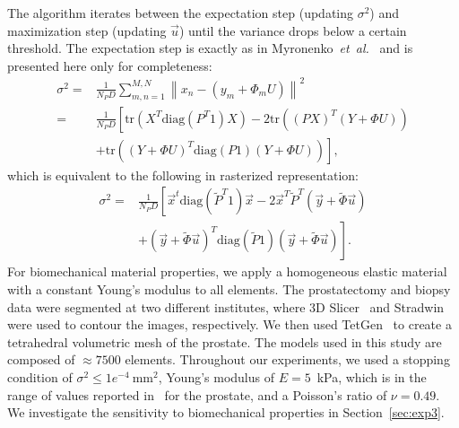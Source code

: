 \documentclass[journal]{IEEEtran}
\newcommand{\trace}{\mathrm{tr}}
\newcommand{\diag}{\mathrm{diag}}
\begin{document}
The algorithm iterates between the expectation step (updating $\sigma^2$) and maximization step (updating $\vec{u}$) until the variance drops below a certain threshold.  The expectation step is exactly as in Myronenko~\textit{et~al.}~\cite{Myronenko10a} and is presented here only for completeness:
\begin{align}
\sigma^2 = & \frac{1}{N_PD}\sum_{m,n=1}^{M,N}\left\|x_n- (y_m+\Phi_mU)\right\|^2 \nonumber\\
= & \frac{1}{N_PD}\left[\trace\!\left(X^T\diag(P^T1)X\right)-2\trace\!\left((PX)^T(Y+{\Phi}U)\right)\right.\nonumber\\
& \left.+\trace\!\left((Y+{\Phi}U)^T\diag(P1)(Y+{\Phi}U)\right)\right], \label{eq:estep1}
\end{align}
which is equivalent to the following in rasterized representation:
\begin{align} 
\sigma^2 = & \frac{1}{N_PD}\left[\vec{x}^t\diag\!\left(\tilde{P}^T1\right)\vec{x} -2\vec{x}^T\tilde{P}^T(\vec{y}+\tilde{\Phi}\vec{u})\right.\nonumber\\
  & \left.+(\vec{y}+\tilde{\Phi}\vec{u})^T\diag\!\left(\tilde{P}1\right)(\vec{y}+\tilde{\Phi}\vec{u})\right]. \label{eq:estep2}
\end{align}
For biomechanical material properties, we apply a homogeneous elastic material with a constant Young's modulus to all elements. The prostatectomy and biopsy data were segmented at two different institutes, where 3D Slicer~\cite{Fedorov12a} and Stradwin~\cite{Treece00a} were used to contour the images, respectively. We then used TetGen~\cite{Si06a} to create a tetrahedral volumetric mesh of the prostate.  The models used in this study are composed of $\approx7500$ elements. Throughout our experiments, we used a stopping condition of $\sigma^2\leq1e^{-4}~\mathrm{mm}^2$, Young's modulus of $E=5$~kPa, which is in the range of values reported in~\cite{Kemper04a} for the prostate, and a Poisson's ratio of $\nu=0.49$. We investigate the sensitivity to biomechanical properties in Section~\ref{sec:exp3}.

\end{document}
